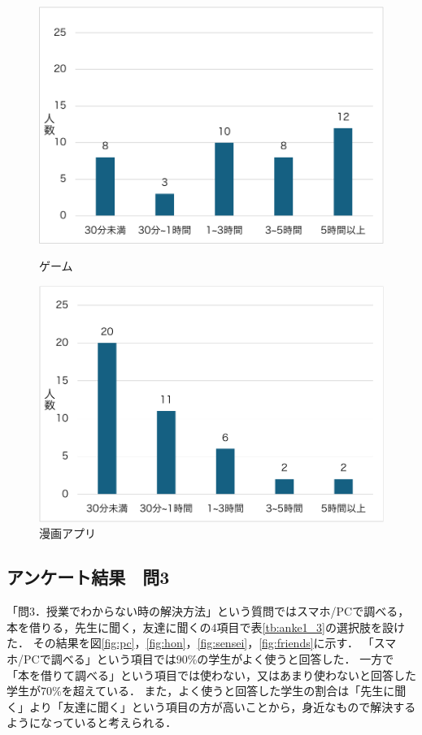 \documentclass[12pt,a4j,titlepage]{ltjsarticle}
\begin{document}
\begin{figure}[!htb]
\centering
\begin{minipage}[b]{0.49\columnwidth}
    \centering
    \includegraphics[width=1.0\columnwidth]{ゲーム.pdf}
    \caption{ゲーム}
    \label{fig:game}
\end{minipage}
\begin{minipage}[b]{0.49\columnwidth}
    \centering
    \includegraphics[width=1.0\columnwidth]{漫画アプリ.pdf}
    \caption{漫画アプリ}
    \label{fig:manga}
\end{minipage}
\end{figure}

\clearpage

\subsection{アンケート結果　問3}
「問3．授業でわからない時の解決方法」という質問ではスマホ/PCで調べる，本を借りる，先生に聞く，友達に聞くの4項目で表\ref{tb:anke1_3}の選択肢を設けた．
その結果を図\ref{fig:pc}，\ref{fig:hon}，\ref{fig:sensei}，\ref{fig:friends}に示す．
「スマホ/PCで調べる」という項目では90\%の学生がよく使うと回答した．
一方で「本を借りて調べる」という項目では使わない，又はあまり使わないと回答した学生が70\%を超えている．
また，よく使うと回答した学生の割合は「先生に聞く」より「友達に聞く」という項目の方が高いことから，身近なもので解決するようになっていると考えられる．
\end{document}
